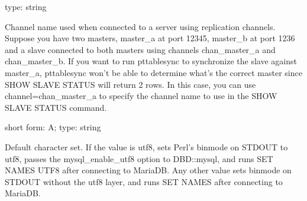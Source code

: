 \documentclass[letterpaper,10pt,english]{sphinxmanual}
\begin{document}
\begin{fulllineitems}
\label{\detokenize{mariadb-schema-change:cmdoption-mariadb-schema-change-channel}}
\sphinxAtStartPar
type: string

\sphinxAtStartPar
Channel name used when connected to a server using replication channels.
Suppose you have two masters, master\_a at port 12345, master\_b at port 1236 and
a slave connected to both masters using channels chan\_master\_a and chan\_master\_b.
If you want to run pt\sphinxhyphen{}table\sphinxhyphen{}sync to synchronize the slave against master\_a, pt\sphinxhyphen{}table\sphinxhyphen{}sync
won’t be able to determine what’s the correct master since SHOW SLAVE STATUS
will return 2 rows. In this case, you can use \textendash{}channel=chan\_master\_a to specify
the channel name to use in the SHOW SLAVE STATUS command.

\end{fulllineitems}


\begin{fulllineitems}
\label{\detokenize{mariadb-schema-change:cmdoption-mariadb-schema-change-charset}}
\sphinxAtStartPar
short form: \sphinxhyphen{}A; type: string

\sphinxAtStartPar
Default character set.  If the value is utf8, sets Perl’s binmode on
STDOUT to utf8, passes the mysql\_enable\_utf8 option to DBD::mysql, and runs SET
NAMES UTF8 after connecting to MariaDB.  Any other value sets binmode on STDOUT
without the utf8 layer, and runs SET NAMES after connecting to MariaDB.

\end{fulllineitems}

\end{document}

